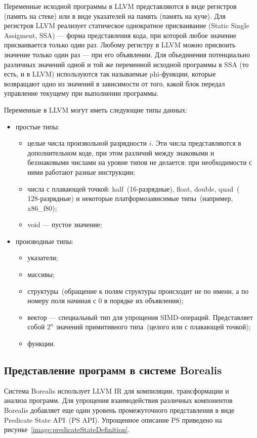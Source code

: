 Переменные исходной программы в LLVM представляются в виде регистров (память
на стеке) или в виде указателей на память (память на куче). Для регистров 
LLVM реализует статическое однократное присваивание (Static Single Assigment, 
SSA) --- форма представления кода, при которой любое значение присваивается 
только один раз. Любому регистру в LLVM можно присвоить значение только один 
раз --- при его объявлении. Для объединения потенциально различных значений 
одной и той же переменной исходной программы в SSA (то есть, и в LLVM) 
используются так называемые phi-функции, которые возвращают одно из значений в 
зависимости от того, какой блок передал управление текущему при выполнении 
программы.

Переменные в LLVM могут иметь следующие типы данных:
\begin{itemize}
\item простые типы:
    \begin{itemize}
    \item целые числа произвольной разрядности $i$. Эти числа представляются в 
    дополнительном коде, при этом различий между знаковыми и беззнаковыми 
    числами на уровне типов не делается: при необходимости с ними работают 
    разные инструкции;
    \item числа с плавающей точкой: half~(16-разрядные), float, double, quad~(
    128-разрядные) и некоторые платформозависимые типы~(например, x86\_f80);
    \item void --- пустое значение;
    \end{itemize}

\item производные типы:
    \begin{itemize}
    \item указатели;
    \item массивы;
    \item структуры~(обращение к полям структуры происходит не по имени, а по 
    номеру поля начиная с 0 в порядке их объявления);
    \item вектор --- специальный тип для упрощения SIMD-операций. Представляет 
    собой $2^n$ значений примитивного типа~(целого или с плавающей точкой);
    \item функции.
    \end{itemize}
\end{itemize}

\subsection{Представление программ в системе Borealis}
Система Borealis использует LLVM IR для компиляции, трансформации и анализа 
программ. Для упрощения взаимодействия различных компонентов Borealis 
добавляет еще один уровень промежуточного представления в виде Predicate State 
API~(PS API). Упрощенное описание PS приведено на 
рисунке~\ref{image:predicateStateDefinition}.

